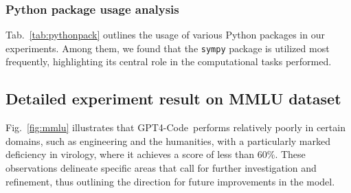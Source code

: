 \documentclass{article} \usepackage{iclr2023_conference,times}
\newcommand{\gptcode}{GPT4-Code}
\begin{document}
\subsubsection{Python package usage analysis}

Tab.~\ref{tab:pythonpack} outlines the usage of various Python packages in our experiments. Among them, we found that the \texttt{sympy} package is utilized most frequently, highlighting its central role in the computational tasks performed.



\begin{table}[ht]
\caption{Python package usage frequency on MATH dataset.}
\label{tab:pythonpack}
\begin{center}
\end{center}
\end{table}



\subsection{Detailed experiment result on MMLU dataset}

Fig.~\ref{fig:mmlu} illustrates that \gptcode~performs relatively poorly in certain domains, such as engineering and the humanities, with a particularly marked deficiency in virology, where it achieves a score of less than 60\%. These observations delineate specific areas that call for further investigation and refinement, thus outlining the direction for future improvements in the model.
\end{document}
